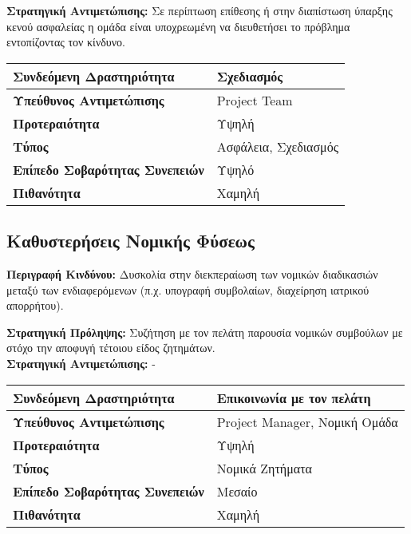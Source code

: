 \documentclass{article}
\newcommand\T{\rule{0pt}{2.6ex}}       %
\newcommand\B{\rule[-1.2ex]{0pt}{0pt}}
\begin{document}
\textbf{Στρατηγική Αντιμετώπισης:} Σε περίπτωση επίθεσης ή στην διαπίστωση ύπαρξης κενού ασφαλείας η ομάδα είναι υποχρεωμένη να διευθετήσει το πρόβλημα εντοπίζοντας τον κίνδυνο.\\
 
 \begin{center}
     \begin{tabular}{|l|l|}
     \hline
      \textbf{Συνδεόμενη Δραστηριότητα}   & Σχεδιασμός \T\B \\ 
      \hline
      \textbf{Υπεύθυνος Αντιμετώπισης} & Project Team \T\B \\
      \hline
      \textbf{Προτεραιότητα} & Υψηλή \T\B \\
      \hline
      \textbf{Τύπος} & Ασφάλεια, Σχεδιασμός \T\B \\
      \hline
      \textbf{Επίπεδο Σοβαρότητας Συνεπειών} & Υψηλό \T\B \\
      \hline
      \textbf{Πιθανότητα} & Χαμηλή \T\B \\
      \hline
     \end{tabular}
 \end{center}

\subsection{Καθυστερήσεις Νομικής Φύσεως}

\textbf{Περιγραφή Κινδύνου:} Δυσκολία στην διεκπεραίωση των νομικών διαδικασιών μεταξύ των ενδιαφερόμενων (π.χ. υπογραφή συμβολαίων, διαχείρηση ιατρικού απορρήτου).\\ 
\newpage

\textbf{Στρατηγική Πρόληψης:} Συζήτηση με τον πελάτη παρουσία νομικών συμβούλων
με στόχο την αποφυγή τέτοιου είδος ζητημάτων.\\

\textbf{Στρατηγική Αντιμετώπισης:} -\\
 
 \begin{center}
     \begin{tabular}{|l|l|}
     \hline
      \textbf{Συνδεόμενη Δραστηριότητα}   & Επικοινωνία με τον πελάτη \T\B \\ 
      \hline
      \textbf{Υπεύθυνος Αντιμετώπισης} & Project Manager, Νομική Ομάδα \T\B \\
      \hline
      \textbf{Προτεραιότητα} & Υψηλή \T\B \\
      \hline
      \textbf{Τύπος} & Νομικά Ζητήματα \T\B \\
      \hline
      \textbf{Επίπεδο Σοβαρότητας Συνεπειών} & Μεσαίο \T\B \\
      \hline
      \textbf{Πιθανότητα} & Χαμηλή \T\B \\
      \hline
     \end{tabular}
 \end{center}
\end{document}
